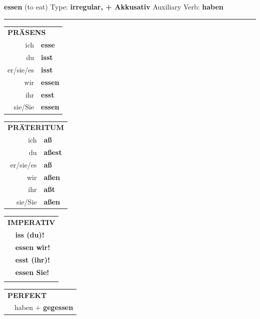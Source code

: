 \documentclass[10pt,a4paper]{revtex4-2}
\begin{document}
\begin{verbbox-acc}
    {\Large \bf essen} (to eat) \hfill Type: \textbf{irregular, + Akkusativ} \hfill Auxiliary Verb: \textbf{haben} 
    
     \vspace{5pt}

    \hrule
    
    \vspace{5pt}

  \begin{tabular}{rl}
     \multicolumn{2}{l}{\textbf{PRÄSENS} }\\
    ich & \textbf{esse}\\
    du & \textbf{isst}\\
    er/sie/es & \textbf{isst}\\
    wir & \textbf{essen}\\
    ihr & \textbf{esst}\\
    sie/Sie & \textbf{essen}\\
  \end{tabular}
  \hfill
     \begin{tabular}{rl}
    \multicolumn{2}{l}{\textbf{PRÄTERITUM} }\\
    ich & \textbf{aß}\\
    du & \textbf{aßest}\\
    er/sie/es & \textbf{aß}\\
    wir & \textbf{aßen}\\
    ihr & \textbf{aßt}\\
    sie/Sie & \textbf{aßen}\\
  \end{tabular}
  \hfill
  \begin{tabular}{rl}
     \multicolumn{2}{l}{\textbf{IMPERATIV} }\\
   & \textbf{iss (du)!}\\
   & \textbf{essen wir!}\\
   & \textbf{esst (ihr)!}\\
   & \textbf{essen Sie!}\\
   & \vspace{10pt}
  \end{tabular}

    \vspace{10pt}

 \begin{tabular}{rl}
     \multicolumn{2}{l}{\textbf{PERFEKT}}\\
  &  haben + \textbf{gegessen}\\
  \end{tabular}
\hfill
   \begin{tabular}{rl}
   

\end{tabular}
\end{verbbox-acc}
\end{document}
